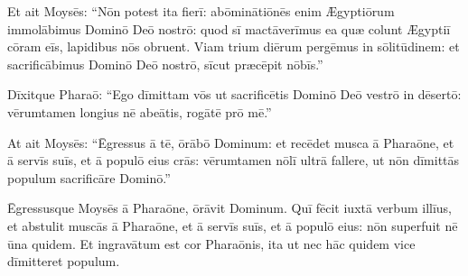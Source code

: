 Et ait Moysēs:
``Nōn potest ita fierī: abōminātiōnēs enim Ægyptiōrum
immolābimus Dominō Deō nostrō: quod sī
mactāverīmus ea quæ colunt Ægyptiī cōram eīs,
lapidibus nōs obruent.  Viam trium diērum
pergēmus in sōlitūdinem: et sacrificābimus Dominō Deō nostrō, sīcut
præcēpit nōbīs.''

Dīxitque
Pharaō: ``Ego dīmittam vōs ut 
sacrificētis Dominō Deō vestrō
in dēsertō: vērumtamen longius nē abeātis, rogātē prō mē.''

At ait Moysēs: ``Ēgressus ā tē, ōrābō Dominum: et
recēdet musca ā Pharaōne, et ā servīs suīs,
et ā populō eius crās: vērumtamen nōlī ultrā fallere, ut
nōn dīmittās populum 
sacrificāre Dominō.''

Ēgressusque Moysēs ā
Pharaōne, ōrāvit Dominum.  Quī fēcit iuxtā verbum illīus,
et abstulit muscās ā Pharaōne, et ā servīs
suīs, et ā populō eius: nōn superfuit nē ūna quidem.  Et
ingravātum est cor
Pharaōnis, ita ut nec hāc quidem vice dīmitteret populum.

